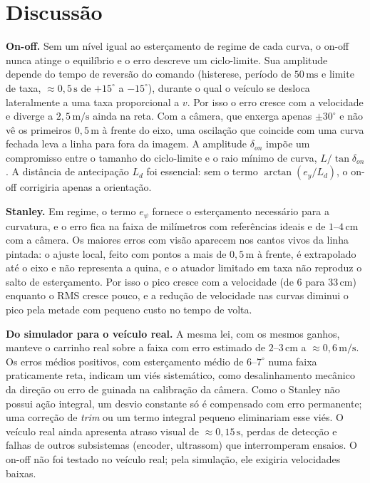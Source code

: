 \section{Discussão}\label{sec:discussao}

\textbf{On-off.} Sem um nível igual ao esterçamento de regime de cada curva, o on-off nunca atinge o equilíbrio e o erro descreve um ciclo-limite. Sua amplitude depende do tempo de reversão do comando (histerese, período de $50\,\mathrm{ms}$ e limite de taxa, $\approx0{,}5\,\mathrm{s}$ de $+15^\circ$ a $-15^\circ$), durante o qual o veículo se desloca lateralmente a uma taxa proporcional a $v$. Por isso o erro cresce com a velocidade e diverge a $2{,}5\,\mathrm{m/s}$ ainda na reta. Com a câmera, que enxerga apenas $\pm30^\circ$ e não vê os primeiros $0{,}5\,\mathrm{m}$ à frente do eixo, uma oscilação que coincide com uma curva fechada leva a linha para fora da imagem. A amplitude $\delta_{on}$ impõe um compromisso entre o tamanho do ciclo-limite e o raio mínimo de curva, $L/\tan\delta_{on}$. A distância de antecipação $L_d$ foi essencial: sem o termo $\arctan(e_y/L_d)$, o on-off corrigiria apenas a orientação.

\textbf{Stanley.} Em regime, o termo $e_\psi$ fornece o esterçamento necessário para a curvatura, e o erro fica na faixa de milímetros com referências ideais e de $1$--$4\,\mathrm{cm}$ com a câmera. Os maiores erros com visão aparecem nos cantos vivos da linha pintada: o ajuste local, feito com pontos a mais de $0{,}5\,\mathrm{m}$ à frente, é extrapolado até o eixo e não representa a quina, e o atuador limitado em taxa não reproduz o salto de esterçamento. Por isso o pico cresce com a velocidade (de $6$ para $33\,\mathrm{cm}$) enquanto o RMS cresce pouco, e a redução de velocidade nas curvas diminui o pico pela metade com pequeno custo no tempo de volta.

\textbf{Do simulador para o veículo real.} A mesma lei, com os mesmos ganhos, manteve o carrinho real sobre a faixa com erro estimado de $2$--$3\,\mathrm{cm}$ a $\approx0{,}6\,\mathrm{m/s}$. Os erros médios positivos, com esterçamento médio de $6$--$7^\circ$ numa faixa praticamente reta, indicam um viés sistemático, como desalinhamento mecânico da direção ou erro de guinada na calibração da câmera. Como o Stanley não possui ação integral, um desvio constante só é compensado com erro permanente; uma correção de \textit{trim} ou um termo integral pequeno eliminariam esse viés. O veículo real ainda apresenta atraso visual de $\approx0{,}15\,\mathrm{s}$, perdas de detecção e falhas de outros subsistemas (encoder, ultrassom) que interromperam ensaios. O on-off não foi testado no veículo real; pela simulação, ele exigiria velocidades baixas.

